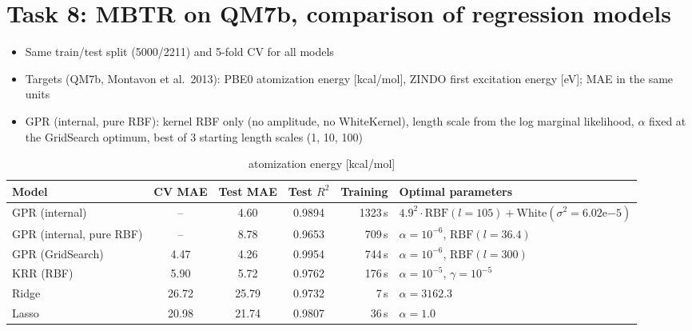 \documentclass[11pt,a4paper]{article}
\begin{document}
\clearpage
\section*{Task 8: MBTR on QM7b, comparison of regression models}

\begin{itemize}\itemsep2pt
  \item Same train/test split (5000/2211) and 5-fold CV for all models
  \item Targets (QM7b, Montavon et al.\ 2013): PBE0 atomization energy [kcal/mol], ZINDO first excitation energy [eV]; MAE in the same units
  \item GPR (internal, pure RBF): kernel RBF only (no amplitude, no WhiteKernel), length scale from the log marginal likelihood, $\alpha$ fixed at the GridSearch optimum, best of 3 starting length scales (1, 10, 100)
\end{itemize}

\begin{table}[H]
\centering
\footnotesize
\setlength{\tabcolsep}{3pt}
\begin{tabular}{lcccrl}
\toprule
Model & CV MAE & Test MAE & Test $R^2$ & Training & Optimal parameters \\
\midrule
GPR (internal)           & --    & 4.60  & 0.9894 & 1323\,s & $4.9^2 \cdot \mathrm{RBF}(l{=}105) + \mathrm{White}(\sigma^2{=}6.02\mathrm{e}{-5})$ \\
GPR (internal, pure RBF) & --    & 8.78  & 0.9653 & 709\,s  & $\alpha = 10^{-6}$, $\mathrm{RBF}(l{=}36.4)$ \\
GPR (GridSearch)         & 4.47  & 4.26  & 0.9954 & 744\,s  & $\alpha = 10^{-6}$, $\mathrm{RBF}(l{=}300)$ \\
KRR (RBF)                & 5.90  & 5.72  & 0.9762 & 176\,s  & $\alpha = 10^{-5}$, $\gamma = 10^{-5}$ \\
Ridge                    & 26.72 & 25.79 & 0.9732 & 7\,s    & $\alpha = 3162.3$ \\
Lasso                    & 20.98 & 21.74 & 0.9807 & 36\,s   & $\alpha = 1.0$ \\
\bottomrule
\end{tabular}
\caption*{atomization energy [kcal/mol]}
\end{table}
\end{document}
